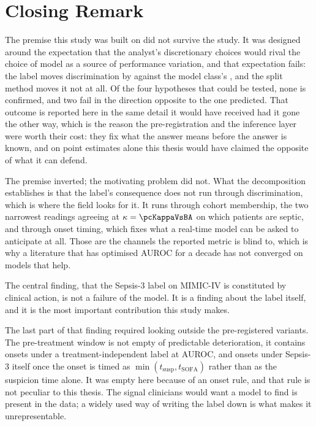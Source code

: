 \section{Closing Remark}

The premise this study was built on did not survive the study. It was designed
around the expectation that the analyst's discretionary choices would rival the
choice of model as a source of performance variation, and that expectation
fails: the label moves discrimination by \pcSpreadLabel{} against the model
class's \pcSpreadModelClass{}, and the split method moves it not at all. Of the
four hypotheses that could be tested, none is confirmed, and two fail in the
direction opposite to the one predicted. That outcome is reported here in the
same detail it would have received had it gone the other way, which is the
reason the pre-registration and the inference layer were worth their cost: they
fix what the answer means before the answer is known, and on point estimates
alone this thesis would have claimed the opposite of what it can defend.

The premise inverted; the motivating problem did not. What the decomposition
establishes is that the label's consequence does not run through
discrimination, which is where the field looks for it. It runs through cohort
membership, the two narrowest readings agreeing at $\kappa = \pcKappaVsBA$ on
which patients are septic, and through onset timing, which fixes what a
real-time model can be asked to anticipate at all. Those are the channels the reported
metric is blind to, which is why a literature that has optimised AUROC for a
decade has not converged on models that help.

The central finding, that the Sepsis-3 label on MIMIC-IV is constituted by
clinical action, is not a failure of the model. It is a finding about the label
itself, and it is the most important contribution this study makes.

The last part of that finding required looking outside the pre-registered
variants. The pre-treatment window is not empty of predictable deterioration,
it contains \pcPreTreatOnsetsVarD{} onsets under a treatment-independent label
at \pcPreTreatAurocPrimaryD{} AUROC, and \pcPreTreatOnsetsVarF{} onsets under
Sepsis-3 itself once the onset is timed as
$\min(t_{\text{susp}}, t_{\text{SOFA}})$ rather than as the suspicion time
alone. It was empty here because of an onset rule, and that rule is not
peculiar to this thesis. The signal clinicians would want a model to find is
present in the data; a widely used way of writing the label down is what makes
it unrepresentable.
